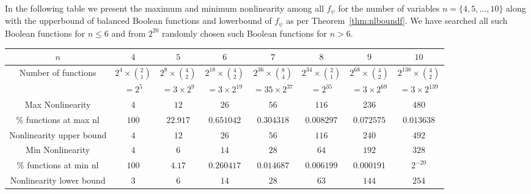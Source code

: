 \documentclass{llncs}
\begin{document}
\fi
In the following table we present the maximum and minimum nonlinearity among all $f_\psi$ for the number of variables $n = \{4, 5, \ldots, 10\}$ along with the upperbound of balanced Boolean functions and lowerbound of $f_{\psi}$ as per Theorem~\ref{thm:nlboundf}. 
We have searched all such Boolean functions for $n \leq 6$ and from $2^{20}$ randomly chosen such Boolean functions for $n > 6$.
\begin{center}
\begin{tabular}{|c|c|c|c||c|c|c|c|}\hline
$n$ & $4$ & $5$ & $6$ & $7$ & $8$ & $9$ & $10$\\ \hline
Number of functions & $2^4 \times \binom{2}{1}$ & $2^8 \times \binom{4}{2}$ & $2^{18} \times \binom{4}{2}$&$2^{36} \times \binom{8}{4}$&$2^{34} \times \binom{2}{1}$& $2^{68} \times \binom{4}{2}$& $2^{138} \times \binom{4}{2}$\\
& $ = 2^5$& $= 3\times 2^9$& $= 3\times 2^{19}$& $= 35\times 2^{37}$&$ = 2^{35}$&$= 3\times 2^{69}$& $= 3\times 2^{139}$\\ \hline
Max Nonlinearity & $4$ & $12$ & $26$ & $56$ & $116$ & $236$ & $480$\\ \hline
\% functions at max nl & $100$ & $22.917$ & $0.651042$ & $0.304318$ & $0.008297$ & $0.072575$ & $0.013638$\\ \hline
Nonlinearity upper bound & $4$ & $12$ & $26$ & $56$ & $116$ & $240$ & $492$\\ \hline
Min Nonlinearity & $4$ & $6$ & $14$ & $28$ & $64$ & $192$ & $328$\\ \hline
\% functions at min nl & $100$ & $4.17$ & $0.260417$ & $0.014687$ & $0.006199$ & $0.000191$ & $2^{-20}$\\ \hline
Nonlinearity lower bound & $3$ & $6$ & $14$ & $28$ & $63$ & $144$ & $254$\\ \hline
\end{tabular}
\end{center}
\end{document}
